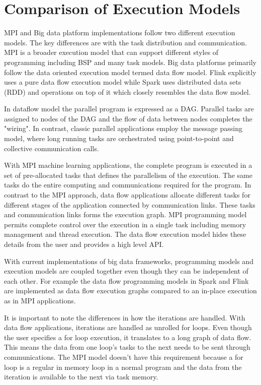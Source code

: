 \documentclass[10pt, conference, compsocconf]{IEEEtran}
\begin{document}
\section{Comparison of Execution Models} \label{sec:exec_models}
MPI and Big data platform implementations follow two different execution models. The key differences are with the task distribution and communication. MPI is a broader execution model that can support different styles of programming including BSP and many task models. Big data platforms primarily follow the data oriented execution model termed data flow model. Flink explicitly uses a pure data flow execution model while Spark uses distributed data sets (RDD) and operations on top of it which closely resembles the data flow model.  

In dataflow model  the parallel program is expressed as a \ac{DAG}. Parallel tasks are assigned to nodes of the \ac{DAG} and the flow of data between nodes completes the "wiring". In contrast, classic parallel applications employ the message passing model, where long running tasks are orchestrated using point-to-point and collective communication calls.

With MPI machine learning applications, the complete program is executed in a set of pre-allocated tasks that defines the parallelism of the execution. The same tasks do the entire computing and communications required for the program. In contrast to the MPI approach, data flow applications allocate different tasks for different stages of the application connected by communication links. These tasks and communication links forms the execution graph. MPI  programming model permits complete control over the execution in a single task including memory management and thread execution. The data flow execution model hides these details from the user and provides a high level API. 

With current implementations of big data frameworks, programming models and execution models are coupled together even though they can be independent of each other. For example the data flow programming models in Spark and Flink are implemented as data flow execution graphs compared to an in-place execution as in MPI applications.

It is important to note the differences in how the iterations are handled. With data flow applications, iterations are handled as unrolled for loops. Even though the user specifies a for loop execution, it translates to a long graph of data flow. This means the data from one loop's tasks to the next needs to be sent through communications. The MPI model doesn't have this requirement because a for loop is a regular in memory loop in a normal program and the data from the iteration is available to the next via task memory. 
\end{document}
